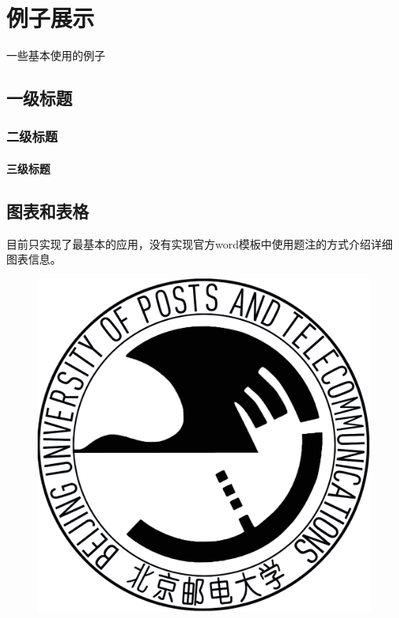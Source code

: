\chapter{例子展示}

一些基本使用的例子


\section{一级标题}
\subsection{二级标题}
\subsubsection{三级标题}

\section{图表和表格}

目前只实现了最基本的应用，没有实现官方word模板中使用题注的方式介绍详细图表信息。

\begin{figure}[htbp]
  \centering
  \includegraphics[width=\textwidth]{resources/logo.png}
  \label{fig:bupt_logo}
\end{figure}

